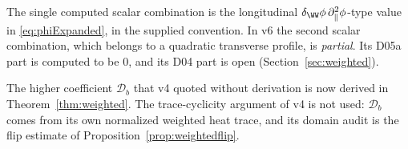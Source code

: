 The single computed scalar combination is the longitudinal
\(\delta_{\WW}\phi\,\partial_\parallel^2\phi\)-type value in
\eqref{eq:phiExpanded}, in the supplied convention.
In v6 the second scalar combination, which belongs to a quadratic
transverse profile, is \emph{partial}.
Its D05a part is computed to be \(0\), and its D04 part is open
(Section~\ref{sec:weighted}).

The higher coefficient \(\mathcal D_b\) that v4 quoted without
derivation is now derived in Theorem~\ref{thm:weighted}.
The trace-cyclicity argument of v4 is not used: \(\mathcal D_b\)
comes from its own normalized weighted heat trace, and its domain
audit is the flip estimate of Proposition~\ref{prop:weightedflip}.
